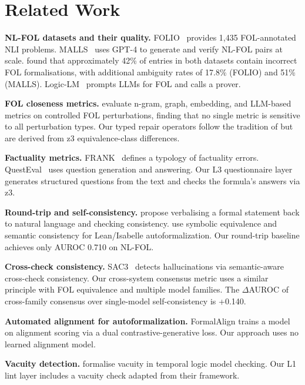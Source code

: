 \documentclass[11pt,letterpaper]{article}
\begin{document}
\section{Related Work}
\label{sec:related_work}

\textbf{NL-FOL datasets and their quality.} FOLIO~\citep{Han2022} provides 1,435 FOL-annotated NLI problems. MALLS~\citep{Yang2023malls} uses GPT-4 to generate and verify NL-FOL pairs at scale. \citet{Brunello2026} found that approximately 42\% of entries in both datasets contain incorrect FOL formalisations, with additional ambiguity rates of 17.8\% (FOLIO) and 51\% (MALLS). Logic-LM~\citep{Pan2023} prompts LLMs for FOL and calls a prover.

\textbf{FOL closeness metrics.} \citet{Thatikonda2025} evaluate n-gram, graph, embedding, and LLM-based metrics on controlled FOL perturbations, finding that no single metric is sensitive to all perturbation types. Our typed repair operators follow the tradition of \citet{Thatikonda2024} but are derived from z3 equivalence-class differences.

\textbf{Factuality metrics.} FRANK~\citep{Pagnoni2021} defines a typology of factuality errors. QuestEval~\citep{Scialom2021} uses question generation and answering. Our L3 questionnaire layer generates structured questions from the text and checks the formula's answers via z3.

\textbf{Round-trip and self-consistency.} \citet{Amrollahi2026} propose verbalising a formal statement back to natural language and checking consistency. \citet{Li2024} use symbolic equivalence and semantic consistency for Lean/Isabelle autoformalization. Our round-trip baseline achieves only AUROC 0.710 on NL-FOL.

\textbf{Cross-check consistency.} SAC3~\citep{Zhang2023sac3} detects hallucinations via semantic-aware cross-check consistency. Our cross-system consensus metric uses a similar principle with FOL equivalence and multiple model families. The $\Delta$AUROC of cross-family consensus over single-model self-consistency is +0.140.

\textbf{Automated alignment for autoformalization.} FormalAlign trains a model on alignment scoring via a dual contrastive-generative loss. Our approach uses no learned alignment model.

\textbf{Vacuity detection.} \citet{Kupferman2003} formalise vacuity in temporal logic model checking. Our L1 lint layer includes a vacuity check adapted from their framework.
\end{document}
